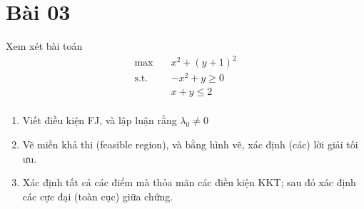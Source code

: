 \section{Bài 03}

Xem xét bài toán
\begin{equation}
    \label{problem:03}
    \begin{aligned}
        \max \quad & x^2 + (y+1)^2\\
        \textrm{s.t.} \quad & -x^2 + y \geq 0\\
          &x + y \leq 2   \\
    \end{aligned}
\end{equation}
\begin{enumerate}[label=(\alph*)]
    \item Viết điều kiện FJ, và lập luận rằng $\lambda_0 \ne 0$
    \item Vẽ miền khả thi (feasible region), và bằng hình vẽ, xác định (các) lời giải tối ưu.
    \item Xác định tất cả các điểm mà thỏa mãn các điều kiện KKT; sau đó xác định các cực đại (toàn cục) giữa chứng.
\end{enumerate}


